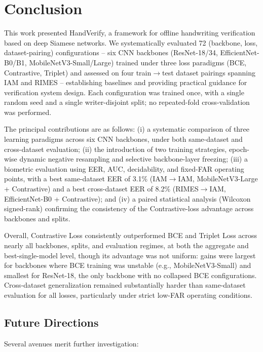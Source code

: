 \section{Conclusion}\label{sec:conclusion}

This work presented HandVerify, a framework for offline handwriting verification based on deep Siamese networks. We systematically evaluated 72 (backbone, loss, dataset-pairing) configurations -- six CNN backbones (ResNet-18/34, EfficientNet-B0/B1, MobileNetV3-Small/Large) trained under three loss paradigms (BCE, Contrastive, Triplet) and assessed on four train$\to$test dataset pairings spanning IAM and RIMES -- establishing baselines and providing practical guidance for verification system design. Each configuration was trained once, with a single random seed and a single writer-disjoint split; no repeated-fold cross-validation was performed.

The principal contributions are as follows: (i) a systematic comparison of three learning paradigms across six CNN backbones, under both same-dataset and cross-dataset evaluation; (ii) the introduction of two training strategies, epoch-wise dynamic negative resampling and selective backbone-layer freezing; (iii) a biometric evaluation using EER, AUC, decidability, and fixed-FAR operating points, with a best same-dataset EER of 3.1\% (IAM$\to$IAM, MobileNetV3-Large + Contrastive) and a best cross-dataset EER of 8.2\% (RIMES$\to$IAM, EfficientNet-B0 + Contrastive); and (iv) a paired statistical analysis (Wilcoxon signed-rank) confirming the consistency of the Contrastive-loss advantage across backbones and splits.

Overall, Contrastive Loss consistently outperformed BCE and Triplet Loss across nearly all backbones, splits, and evaluation regimes, at both the aggregate and best-single-model level, though its advantage was not uniform: gains were largest for backbones where BCE training was unstable (e.g., MobileNetV3-Small) and smallest for ResNet-18, the only backbone with no collapsed BCE configurations. Cross-dataset generalization remained substantially harder than same-dataset evaluation for all losses, particularly under strict low-FAR operating conditions.

\subsection{Future Directions}

Several avenues merit further investigation:

